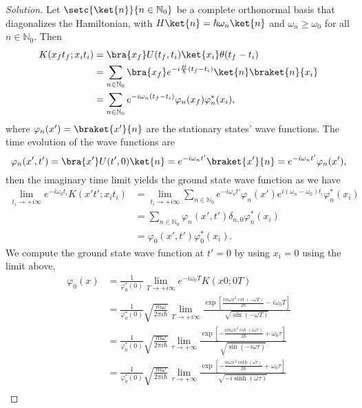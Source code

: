 \begin{proof}[Solution]
   Let \(\setc{\ket{n}}{n \in \mathbb{N}_0}\) be a complete orthonormal basis that diagonalizes the Hamiltonian, with \(H\ket{n} = \hbar \omega_n \ket{n}\) and \(\omega_n \geq \omega_0\) for all \(n \in \mathbb{N}_0.\) Then
   \begin{align*}
      K(x_f t_f; x_i t_i) &= \bra{x_f} U(t_f, t_i) \ket{x_i} \theta(t_f - t_i)\\
                          &= \sum_{n \in \mathbb{N}_0} \bra{x_f}e^{-i \frac{H}{\hbar} (t_f - t_i)}\ket{n}\braket{n}{x_i}\\
                          &= \sum_{n \in \mathbb{N}_0} e^{-i \omega_n (t_f - t_i)} \varphi_n(x_f) \varphi^*_n(x_i),
   \end{align*}
   where \(\varphi_n(x') = \braket{x'}{n}\) are the stationary states' wave functions. The time evolution of the wave functions are
   \begin{equation*}
      \varphi_n(x', t') = \bra{x'} U(t', 0) \ket{n} = e^{-i \omega_n t'} \braket{x'}{n} = e^{-i\omega_n t'} \varphi_n(x'),
   \end{equation*}
   then the imaginary time limit yields the ground state wave function as we have
   \begin{align*}
      \lim_{t_i \to + i \infty}{e^{-i \omega_0 t_i} K(x' t'; x_i t_i)}
      &= \lim_{t_i \to +i \infty}{\sum_{n \in \mathbb{N}_0} e^{-i \omega_n t'} \varphi_n(x') e^{i (\omega_n - \omega_0) t_i} \varphi^*_n(x_i)}\\
      &= \sum_{n \in \mathbb{N}_0} \varphi_n(x', t') \delta_{n,0} \varphi_n^*(x_i)\\
      &= \varphi_0(x', t') \varphi_0^*(x_i).
   \end{align*}
   We compute the ground state wave function at \(t' = 0\) by using \(x_i = 0\) using the limit above,
   \begin{align*}
      \varphi_0(x) &= \frac{1}{\varphi_0^*(0)} \lim_{T \to +i \infty}{ e^{-i \omega_0 T} K(x 0; 0 T)}\\
                   &= \frac{1}{\varphi_0^*(0)} \sqrt{\frac{m \omega}{2\pi i \hbar}} \lim_{T \to +i\infty}{\frac{\exp\left[\frac{im \omega x^2 \cot(- \omega T)}{2\hbar} - i \omega_0 T\right]}{\sqrt{\sin(-\omega T)}}}\\
                   &= \frac{1}{\varphi_0^*(0)} \sqrt{\frac{m \omega}{2\pi i \hbar}} \lim_{\tau \to +\infty}{\frac{\exp\left[-\frac{im \omega x^2 \cot(i\omega \tau)}{2\hbar} + \omega_0 \tau\right]}{\sqrt{\sin(-i\omega \tau)}}}\\
                   &= \frac{1}{\varphi_0^*(0)}\sqrt{\frac{m \omega}{2 \pi i \hbar}} \lim_{\tau \to +\infty}{\frac{\exp\left[-\frac{m \omega x^2 \coth(\omega \tau)}{2\hbar} + \omega_0 \tau\right]}{\sqrt{-i \sinh(\omega \tau)}}}\\

\end{align*}
\end{proof}
